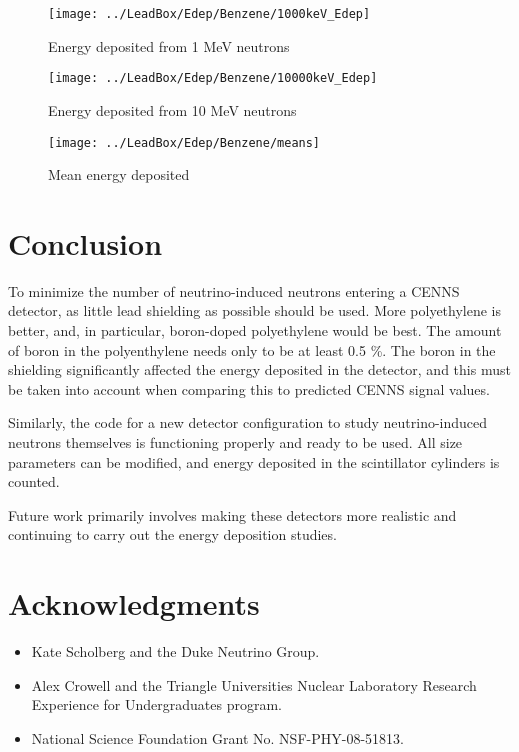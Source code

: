 \documentclass[12pt]{article}
\begin{document}
\begin{figure}[H]
  \centering
  \begin{minipage}[t]{0.45\linewidth}
    \texttt{[image: ../LeadBox/Edep/Benzene/1000keV\_Edep]}
    \caption{Energy deposited from 1 MeV neutrons}
    \label{fig:1MeV}
  \end{minipage}
  \quad
  \begin{minipage}[t]{0.45\linewidth}
    \texttt{[image: ../LeadBox/Edep/Benzene/10000keV\_Edep]}
    \caption{Energy deposited from 10 MeV neutrons}
    \label{fig:10MeV}
  \end{minipage}
\end{figure}

\begin{figure}[H]
  \centering
  \texttt{[image: ../LeadBox/Edep/Benzene/means]}
  \caption{Mean energy deposited}
  \label{fig:means}
\end{figure}

\section{Conclusion}
To minimize the number of neutrino-induced neutrons entering a CENNS detector, as little lead shielding as possible should be used. More polyethylene is better, and, in particular, boron-doped polyethylene would be best. The amount of boron in the polyenthylene needs only to be at least 0.5 \%. The boron in the shielding significantly affected the energy deposited in the detector, and this must be taken into account when comparing this to predicted CENNS signal values.

Similarly, the code for a new detector configuration to study neutrino-induced neutrons themselves is functioning properly and ready to be used. All size parameters can be modified, and energy deposited in the scintillator cylinders is counted.

Future work primarily involves making these detectors more realistic and continuing to carry out the energy deposition studies.

\section*{Acknowledgments}
\begin{itemize}
  \item[] Kate Scholberg and the Duke Neutrino Group.
  \item[] Alex Crowell and the Triangle Universities Nuclear Laboratory Research Experience for Undergraduates program.
  \item[] National Science Foundation Grant No. NSF-PHY-08-51813.
\end{itemize}



\end{document}
